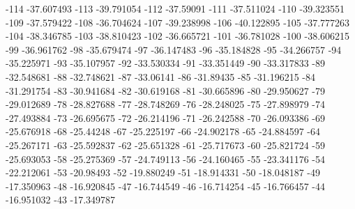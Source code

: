 -114                      -37.607493
-113                      -39.791054
-112                       -37.59091
-111                      -37.511024
-110                      -39.323551
-109                      -37.579422
-108                      -36.704624
-107                      -39.238998
-106                      -40.122895
-105                      -37.777263
-104                      -38.346785
-103                      -38.810423
-102                      -36.665721
-101                      -36.781028
-100                      -38.606215
-99                      -36.961762
-98                      -35.679474
-97                      -36.147483
-96                      -35.184828
-95                      -34.266757
-94                      -35.225971
-93                      -35.107957
-92                      -33.530334
-91                      -33.351449
-90                      -33.317833
-89                      -32.548681
-88                      -32.748621
-87                       -33.06141
-86                       -31.89435
-85                      -31.196215
-84                      -31.291754
-83                      -30.941684
-82                      -30.619168
-81                      -30.665896
-80                      -29.950627
-79                      -29.012689
-78                      -28.827688
-77                      -28.748269
-76                      -28.248025
-75                      -27.898979
-74                      -27.493884
-73                      -26.695675
-72                      -26.214196
-71                      -26.242588
-70                      -26.093386
-69                      -25.676918
-68                       -25.44248
-67                      -25.225197
-66                      -24.902178
-65                      -24.884597
-64                      -25.267171
-63                      -25.592837
-62                      -25.651328
-61                      -25.717673
-60                      -25.821724
-59                      -25.693053
-58                      -25.275369
-57                      -24.749113
-56                      -24.160465
-55                      -23.341176
-54                      -22.212061
-53                       -20.98493
-52                      -19.880249
-51                      -18.914331
-50                      -18.048187
-49                      -17.350963
-48                      -16.920845
-47                      -16.744549
-46                      -16.714254
-45                      -16.766457
-44                      -16.951032
-43                      -17.349787
